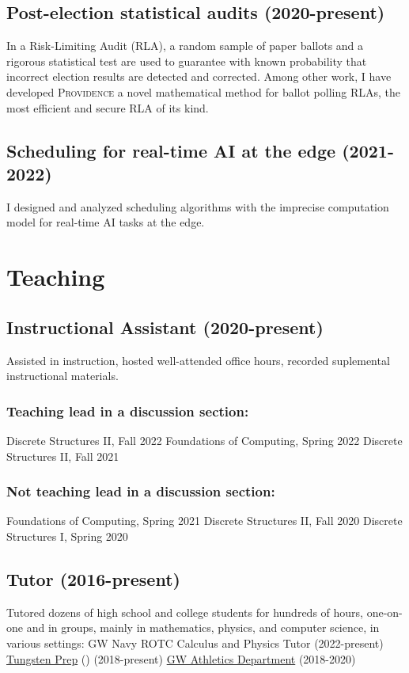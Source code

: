 \documentclass[letterpaper]{article}
\newcommand{\Providence}{\textsc{Providence}\xspace}
\begin{document}
\subsection*{Post-election statistical audits (2020-present)}
In a Risk-Limiting Audit (RLA), a random sample of paper ballots and a rigorous statistical test are used to guarantee with known probability that incorrect election results are detected and corrected.
Among other work, I have developed \Providence a novel mathematical method for ballot polling RLAs, the most efficient and secure RLA of its kind.

\subsection*{Scheduling for real-time AI at the edge (2021-2022)}
I designed and analyzed scheduling algorithms with the imprecise computation model for real-time AI tasks at the edge. 

\section*{Teaching}
\subsection*{Instructional Assistant (2020-present)}
Assisted in instruction, hosted well-attended office hours, recorded suplemental instructional materials.
\subsubsection*{Teaching lead in a discussion section:}
\subitem
Discrete Structures II, Fall 2022
\subitem
Foundations of Computing, Spring 2022
\subitem
Discrete Structures II, Fall 2021
\subsubsection*{Not teaching lead in a discussion section:}
\subitem
Foundations of Computing, Spring 2021
\subitem
Discrete Structures II, Fall 2020
\subitem
Discrete Structures I, Spring 2020

\subsection*{Tutor (2016-present)}
Tutored dozens of high school and college students for hundreds of hours, one-on-one and in groups, mainly in mathematics, physics, and computer science, in various settings:
\subitem 
GW Navy ROTC Calculus and Physics Tutor (2022-present)
\subitem
\href{https://www.tungstenprep.com/}{Tungsten Prep} () (2018-present) 
\subitem
\href{https://gwsports.com/sports/2018/7/23/school-bio-academic-support-tutor-info-html.aspx}{GW Athletics Department} (2018-2020) 
\end{document}
